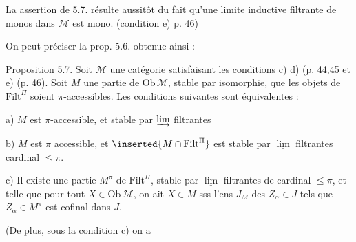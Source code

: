 
La  assertion de 5.7. résulte aussitôt du fait qu'une limite inductive filtrante de monos dans $\mathcal M$ est mono. (condition e) p. 46)

On peut préciser la prop. 5.6. obtenue ainsi :

\uline{Proposition 5.7.}  Soit $\mathcal M$ une catégorie satisfaisant les conditions  c) d) (p. 44,45\unsure{,|-} et e) (p. 46). Soit $M$ une partie de $\mathrm{Ob}\,\mathcal M$, stable par isomorphie,   que les objets de $\mathrm{Filt}^{\Pi}$ soient $\pi$-accessibles. Les conditions suivantes sont équivalentes :

a) $M$ est $\pi$-accessible, et stable par $\varinjlim$ filtrantes

b) $M$ est $\pi$ accessible, et $\inserted{M\cap\mathrm{Filt}^{\Pi}}$  est stable par $\underline{\lim}$ filtrantes  cardinal $\leq\pi$.


c) Il existe une partie $M^\pi$ de $\mathrm{Filt}^{\Pi}$, stable par $\underline{\lim}$ filtrantes de cardinal $\leq\pi$,  et telle que pour tout $X\in\mathrm{Ob}\,\mathcal M$,  on ait  $X\in M$ sss l'ens $J_M$ des $Z_\alpha\in J$ tels que $Z_\alpha\in M^\pi$  est cofinal dans $J$.

(De plus, sous la condition c) on a

